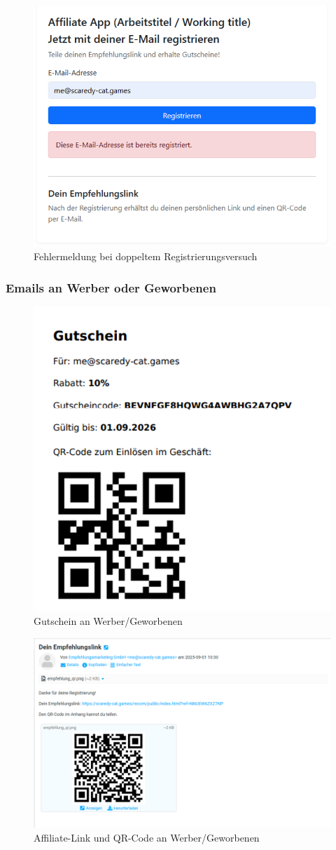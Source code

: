 \begin{figure}[H]
    \centering
    \includegraphics[width=0.8\linewidth]{Bilder/screenshots/form_already_registered.png}
    \caption{Fehlermeldung bei doppeltem Registrierungsversuch}
    \label{fig:placeholder}
\end{figure}

\subsubsection{Emails an Werber oder Geworbenen}
\begin{figure}[H]
    \centering
    \includegraphics[width=0.5\linewidth]{Bilder/screenshots/email_voucher.png}
    \caption{Gutschein an Werber/Geworbenen}
    \label{fig:placeholder}
\end{figure}

\begin{figure}[H]
    \centering
    \includegraphics[width=1.0\linewidth]{Bilder/screenshots/mail_affiliate_link.png}
    \caption{Affiliate-Link und QR-Code an Werber/Geworbenen}
    \label{fig:placeholder}
\end{figure}